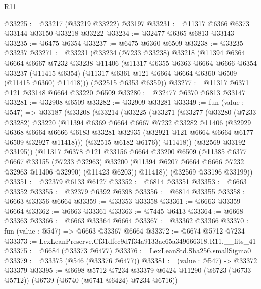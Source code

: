 \begin{lexlean}{R11}
\begin{coremodule}
@33225 := @33217 (@33219 @33222) @33197
@33231 := @11317 @6366 @6373 @33144 @33150 @33218 @33222
@33234 := @32477 @6365 @6813 @33143
@33235 := @6475 @6354
@33237 := @6475 @6360 @6509
@33238 := @33235 @33237
@33271 := @33231
    (@33234
      (@7233 @33238)
      @33218
      (@11394
        @6364
        @6664
        @6667
        @7232
        @33238
        @11406
        (@11317
          @6355
          @6363
          @6664
          @6666
          @6354
          @33237
          (@11415 @6354)
          (@11317 @6361 @121 @6664 @6664 @6360 @6509 (@11415 @6360) @11418)))
      (@32515 @6353 @6359))
@33277 := @11317 @6371 @121 @33148 @6664 @33220 @6509
@33280 := @32477 @6370 @6813 @33147
@33281 := @32908 @6509
@33282 := @32909 @33281
@33349 := fun (value : @547) =>
  @33187
    (@33208
      (@33214
        (@33225
          (@33271
            (@33277
              (@33280
                (@7233 @33282)
                @33220
                (@11394
                  @6369
                  @6664
                  @6667
                  @7232
                  @33282
                  @11406
                  (@32929
                    @6368
                    @6664
                    @6666
                    @6183
                    @33281
                    @32935
                    (@32921 @121 @6664 @6664 @6177 @6509 @32927 @11418)))
                (@32515 @6182 @6176))
              @11418))
          (@32569 @33192 @33195))
        (@11317
          @6378
          @121
          @33156
          @6664
          @33200
          @6509
          (@11385
            @6377
            @6667
            @33155
            (@7233 @32963)
            @33200
            (@11394 @6207 @6664 @6666 @7232 @32963 @11406 @32990)
            (@11423 @6203))
          @11418))
      (@32569 @33196 @33199))
@33351 := @32379 @6133 @6127
@33352 := @6814 @33351
@33353 := @6663 @33352
@33355 := @32379 @6392 @6398
@33356 := @6814 @33355
@33358 := @6663 @33356 @6664
@33359 := @33353 @33358
@33361 := @6663 @33359 @6664
@33362 := @6663 @33361
@33363 := @7445 @6413
@33364 := @6668 @33363
@33366 := @6663 @33364 @6664
@33367 := @33362 @33366
@33370 := fun (value : @547) => @6663 @33367 @6664
@33372 := @6674 @5712 @7234
@33373 := LexLeanPreserve.Cf31dfec9d7f34a9133ae65a349666318.R11.__fits_41
@33375 := @6684 (@33373 @6477)
@33376 := LexLeanStd.Sha256.smallSigma0
@33379 := @33375 (@546 (@33376 @6477))
@33381 := (value : @547) -> @33372 @33379
@33395 := @6698
    @5712
    @7234
    @33379
    @6424
    @11290
    (@6723 (@6733 @5712))
    (@6739 (@6740 (@6741 @6424) @7234 @6716))

\end{coremodule}
\end{lexlean}
